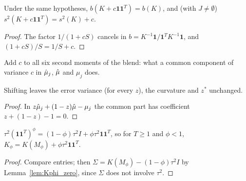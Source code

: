 \begin{theorem}\label{thm:glsWeight_add_rankOne}
  \leanok
  Under the same hypotheses, $b(K + c\mathbf 1\mathbf 1^T) = b(K)$, and (with
  $J \ne \emptyset$) $s^2(K + c\mathbf 1\mathbf 1^T) = s^2(K) + c$.
\end{theorem}
\begin{proof}
  \leanok
  The factor $1/(1+cS)$ cancels in $b = K^{-1}\mathbf 1/\mathbf 1^TK^{-1}\mathbf 1$,
  and $(1+cS)/S = 1/S + c$.
\end{proof}

\begin{definition}\label{def:shift}
  \leanok
  Add $c$ to all six second moments of the blend: what a common component
  of variance $c$ in $\hat\mu_j$, $\hat\mu$ and $\mu_j$ does.
\end{definition}

\begin{lemma}\label{lem:shift}
  \leanok
  Shifting leaves the error variance (for every $z$), the curvature and
  $z^\ast$ unchanged.
\end{lemma}
\begin{proof}
  \leanok
  In $z\hat\mu_j + (1-z)\hat\mu - \mu_j$ the common part has coefficient
  $z + (1-z) - 1 = 0$.
\end{proof}

\begin{lemma}\label{lem:Kphi_eq}
  \leanok
  $\tau^2(\mathbf 1\mathbf 1^T)^\phi = (1-\phi)\tau^2 I + \phi\tau^2\mathbf 1\mathbf 1^T$,
  so for $T \ge 1$ and $\phi < 1$,
  $K_\phi = K(M_\phi) + \phi\tau^2\mathbf 1\mathbf 1^T$.
\end{lemma}
\begin{proof}
  \leanok
  Compare entries; then $\Sigma = K(M_\phi) - (1-\phi)\tau^2 I$ by
  Lemma~\ref{lem:Kphi_zero}, since $\Sigma$ does not involve $\tau^2$.
\end{proof}

